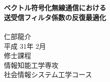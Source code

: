 \documentclass[11pt,oneside,titlepage]{jsbook}
\begin{document}
\captiondelim{ }%
\rhead{\textbf{\thepage}}　　　%
\cfoot{}　　　　　　　　　　　%
\renewcommand{\headrulewidth}{0.4pt}
\renewcommand{\footrulewidth}{0.4pt}
\setlength{\baselineskip}{18.95pt}

\makeatletter
\renewcommand{\chapter}{
  \if@openright\cleardoublepage\else\clearpage\fi
  \global\@topnum\z@
  \secdef\@chapter\@schapter}
\makeatother

\vspace*{3cm}%
\begin{center}%
{\Large \textbf{}}\\%
\vspace{3mm}
{\Large \textbf{ベクトル符号化無線通信における\\送受信フィルタ係数の反復最適化}} \\
\vspace{5cm}%
\indent \\
{\Large 仁部龍介} \\
\vspace{5mm}
{\Large 平成 31年 2月} \\
\vspace{5mm}
{\Large 修士課程 \\ 情報知能工学専攻 \\ 社会情報システム工学コース} \\
\end{center}%
\thispagestyle{empty}%


%

\frontmatter %
\clearpage %



\tableofcontents %
\rhead{}

\mainmatter %

\newpage
\rhead{\thepage}
\backmatter          %
%
\end{document}
